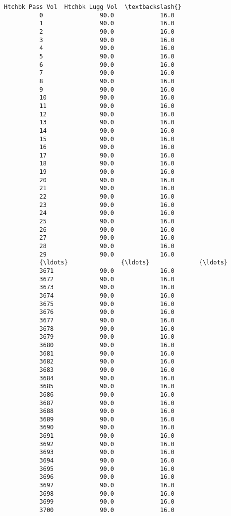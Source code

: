 \documentclass[11pt]{article}
\begin{document}
\begin{Verbatim}[commandchars=\\\{\}]
                Htchbk Pass Vol  Htchbk Lugg Vol  \textbackslash{}
          0                90.0             16.0   
          1                90.0             16.0   
          2                90.0             16.0   
          3                90.0             16.0   
          4                90.0             16.0   
          5                90.0             16.0   
          6                90.0             16.0   
          7                90.0             16.0   
          8                90.0             16.0   
          9                90.0             16.0   
          10               90.0             16.0   
          11               90.0             16.0   
          12               90.0             16.0   
          13               90.0             16.0   
          14               90.0             16.0   
          15               90.0             16.0   
          16               90.0             16.0   
          17               90.0             16.0   
          18               90.0             16.0   
          19               90.0             16.0   
          20               90.0             16.0   
          21               90.0             16.0   
          22               90.0             16.0   
          23               90.0             16.0   
          24               90.0             16.0   
          25               90.0             16.0   
          26               90.0             16.0   
          27               90.0             16.0   
          28               90.0             16.0   
          29               90.0             16.0   
          {\ldots}               {\ldots}              {\ldots}   
          3671             90.0             16.0   
          3672             90.0             16.0   
          3673             90.0             16.0   
          3674             90.0             16.0   
          3675             90.0             16.0   
          3676             90.0             16.0   
          3677             90.0             16.0   
          3678             90.0             16.0   
          3679             90.0             16.0   
          3680             90.0             16.0   
          3681             90.0             16.0   
          3682             90.0             16.0   
          3683             90.0             16.0   
          3684             90.0             16.0   
          3685             90.0             16.0   
          3686             90.0             16.0   
          3687             90.0             16.0   
          3688             90.0             16.0   
          3689             90.0             16.0   
          3690             90.0             16.0   
          3691             90.0             16.0   
          3692             90.0             16.0   
          3693             90.0             16.0   
          3694             90.0             16.0   
          3695             90.0             16.0   
          3696             90.0             16.0   
          3697             90.0             16.0   
          3698             90.0             16.0   
          3699             90.0             16.0   
          3700             90.0             16.0   
          

\end{Verbatim}
\end{document}
